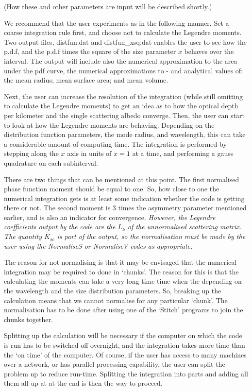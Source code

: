 \begin{flushleft}
(How these and other parameters are input will be described shortly.)

We recommend that the user experiments as in the following manner. 
Set a coarse
integration rule first, and choose not to calculate the Legendre moments.
Two output files, distfun.dat and  distfun\_xsq.dat  enables the user to see how
the p.d.f, and the p.d.f times the square of the size parameter $x$ behaves over the
interval.
The output
will include also the numerical approximation to the
 area under the pdf curve, the numerical approximations to -  and
analytical values of: the mean radius; mean surface area; and mean volume.

Next, the user can increase the
resolution of the integration (while still omitting to calculate the Legendre
moments) to get an idea as to how the optical depth per kilometer and the single 
scattering albedo converge. Then, the user can start to look at how the
Legendre moments are behaving. Depending on the distribution function parameters,
the  mode radius, and wavelength, this can take a considerable amount of
 computing time. The integration is performed by stepping along the $x$ axis
in units of $x=1$ at a time, and performing a gauss quadrature on each subinterval.  

There are two things that can be mentioned at this point. The first normalised
phase function moment should
be equal to one. So, how close to one the numerical integration gets is at least some
indication whether the code is getting there or not. The second moment is
3 times the asymmetry parameter mentioned earlier, and is also an indicator for
convergence. {\it However, the Legendre coefficients output by the code are the $L_k$
of the unnormalised scattering matrix. The quantity ${\overline K_{sc}}$ is part of the 
output, so the normalisation must be made by the user using the NormaliseS or NormaliseV
codes as appropriate.}

The reason for not normalising is that it may be envisaged that the numerical integration
may be required to done in `chunks'. The reason for this is that the calculating the moments
can take a very long time time when the depending on the wavelength and the size
distribution parameters. So, breaking up the calculation means that we cannot
normalise for any particular `chunk'. The normalisation has to be done after using
 one of the `Stitch' programs to join the chunks together.

Splitting up the calculation will be necessary if the computer on which
the code is run has to be switched off overnight, and the integration takes more
time  than the `on time' of the computer. Of course, if the user has access to many
 machines over a network, or has parallel processing capability, the user can split 
the problem up to reduce run-time.
Splitting the integration into parts
and adding all them all up at at the end is then the way to proceed.


\end{flushleft}
